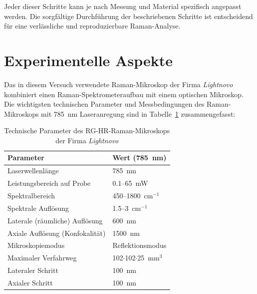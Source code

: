 Jeder dieser Schritte kann je nach Messung und Material spezifisch angepasst werden. Die sorgfältige Durchführung der beschriebenen Schritte ist entscheidend für 
eine verlässliche und reproduzierbare Raman-Analyse.

\section{Experimentelle Aspekte}\label{sec:experiment}
Das in diesem Versuch verwendete Raman-Mikroskop der Firma \textit{Lightnovo} kombiniert einen Raman-Spektrometeraufbau mit einem optischen Mikroskop.
Die wichtigsten technischen Parameter und Messbedingungen des Raman-Mikroskops mit 785~nm Laseranregung sind in Tabelle~\ref{tab:785nm-parameter} zusammengefasst:

\begin{table}[H]
    \centering
    \caption{Technische Parameter des RG-HR-Raman-Mikroskops der Firma \textit{Lightnovo}}
    \begin{tabular}{l|l}
        \textbf{Parameter}                & \textbf{Wert (785~nm)}        \\
        \hline
        Laserwellenlänge                  & 785~nm                        \\
        Leistungsbereich auf Probe        & 0.1--65~mW                  \\
        Spektralbereich                   & 450--1800~cm$^{-1}$       \\
        Spektrale Auflösung               & 1.5--3~cm$^{-1}$        \\
        Laterale (räumliche) Auflösung    & 600~nm                        \\
        Axiale Auflösung (Konfokalität)   & 1500~nm                       \\
        Mikroskopiemodus                  & Reflektionsmodus            \\
        Maximaler Verfahrweg              & 102$\cdot$102$\cdot$25~mm$^3$ \\
        Lateraler Schritt                 & 100~nm                        \\
        Axialer Schritt                   & 100~nm        \\
        \hline                
    \end{tabular}
    \label{tab:785nm-parameter}
\end{table}

